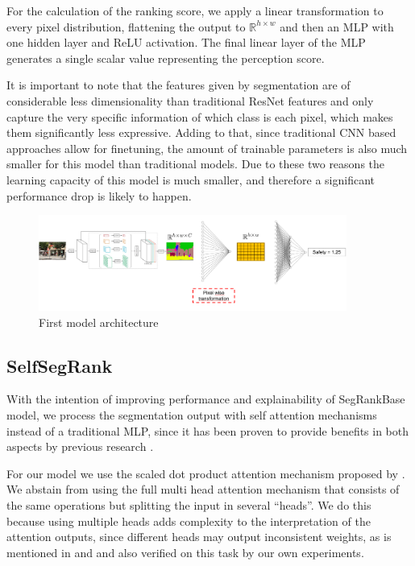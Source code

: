 For the calculation of the ranking score, we apply a linear transformation to every pixel distribution, flattening the output to
$\mathbb{R}^{h \times w}$  and then an MLP with one hidden layer and ReLU activation. The final linear layer
of the MLP generates a single scalar value representing the perception score.

It is important to note that the features given by  segmentation are  of considerable less dimensionality
than traditional ResNet features and only capture the very specific information of which class is each pixel,
which makes them  significantly less expressive. Adding to that,
since traditional CNN based approaches allow for finetuning, the amount of trainable parameters
is also much smaller for this model than traditional models. Due to these two reasons the learning capacity
of this model is much smaller, and therefore a significant performance drop is likely to happen.

\begin{figure}[ht]
	\begin{center}
	\includegraphics[width=0.9\textwidth]{./figures/segrank_1.png}
	\caption[First model architecture]{First model architecture}
	\label{fig:segrank_1}
	\end{center}
\end{figure}

\subsection{SelfSegRank}\label{section:self-attn}
With the intention of improving  performance and explainability of SegRankBase model, we process
the segmentation output with self attention mechanisms instead of a traditional MLP,
since it has been proven to provide benefits in both aspects by previous research \cite{vaswani_attention, wiegreffe_attention, cordonnier_relationship}.

For our model we use the scaled dot product attention mechanism
proposed by . We abstain from using the full multi head attention
mechanism  that consists of the same operations but splitting the input in several ``heads''.
We do this because using multiple heads adds complexity to the interpretation of the attention outputs,
since different heads may output inconsistent weights, as is mentioned in 
and  and also verified on this task by our own experiments.

